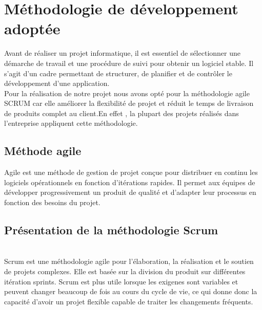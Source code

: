 \section{\selectfont\Large Méthodologie de développement adoptée}

 Avant de réaliser un projet informatique, il est essentiel de sélectionner une démarche de travail et une procédure de suivi pour obtenir un logiciel stable. Il s'agit d'un cadre permettant de structurer, de planifier et de contrôler le développement d'une application.\\
Pour la réalisation de notre projet nous avons opté pour la méthodologie agile SCRUM car elle
améliorer la flexibilité de projet et réduit le temps de livraison de produits complet au client.En
effet , la plupart des projets réalisés dans l’entreprise appliquent cette méthodologie.
 \\[0.2cm]


\subsection{\selectfont\Large Méthode agile }

Agile est une méthode de gestion de projet conçue pour distribuer en continu les logiciels opérationnels en fonction d'itérations rapides. Il permet aux équipes de développer progressivement un produit de qualité et d'adapter leur processus en fonction des besoins du projet.


\subsection{\selectfont\Large  Présentation de la méthodologie Scrum}
\texttt{}\\[0.2cm]

Scrum est une méthodologie agile pour l'élaboration, la réalisation et le soutien de projets complexes. Elle est basée sur la division du produit sur différentes itération sprints.
Scrum est plus utile lorsque les exigenes sont variables et peuvent changer beaucoup de fois au cours du cycle de vie, ce qui donne donc la capacité d'avoir un projet flexible capable de traiter les changements fréquents.
